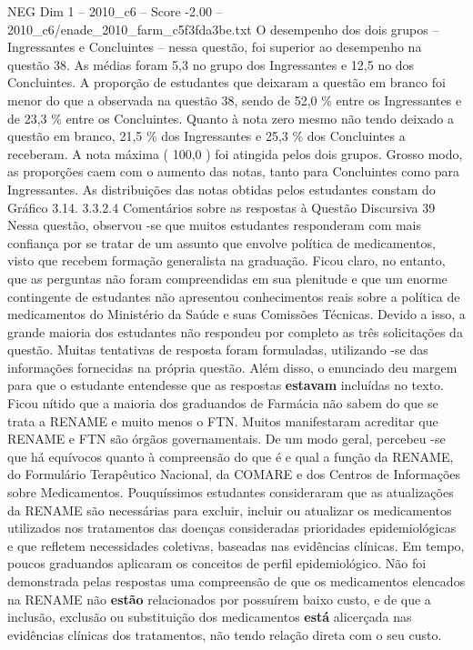 \begin{textsample}{NEG Dim 1 – 2010\_c6 – Score -2.00 – 2010\_c6/enade\_2010\_farm\_c5f3fda3be.txt}
O desempenho dos dois grupos – Ingressantes e Concluintes – nessa questão, foi superior ao desempenho na questão 38.
As médias foram 5,3 no grupo dos Ingressantes e 12,5 no dos Concluintes.
A proporção de estudantes que deixaram a questão em branco foi menor do que a observada na questão 38, sendo de 52,0 \% entre os Ingressantes e de 23,3 \% entre os Concluintes.
Quanto à nota zero mesmo não tendo deixado a questão em branco, 21,5 \% dos Ingressantes e 25,3 \% dos Concluintes a receberam.
A nota máxima ( 100,0 ) foi atingida pelos dois grupos.
Grosso modo, as proporções caem com o aumento das notas, tanto para Concluintes como para Ingressantes.
As distribuições das notas obtidas pelos estudantes constam do Gráfico 3.14. 3.3.2.4 Comentários sobre as respostas à Questão Discursiva 39 Nessa questão, observou -se que muitos estudantes responderam com mais confiança por se tratar de um assunto que envolve política de medicamentos, visto que recebem formação generalista na graduação.
Ficou claro, no entanto, que as perguntas não foram compreendidas em sua plenitude e que um enorme contingente de estudantes não apresentou conhecimentos reais sobre a política de medicamentos do Ministério da Saúde e suas Comissões Técnicas.
Devido a isso, a grande maioria dos estudantes não respondeu por completo as três solicitações da questão.
Muitas tentativas de resposta foram formuladas, utilizando -se das informações fornecidas na própria questão.
Além disso, o enunciado deu margem para que o estudante entendesse que as respostas \textbf{estavam} incluídas no texto.
Ficou nítido que a maioria dos graduandos de Farmácia não sabem do que se trata a RENAME e muito menos o FTN.
Muitos manifestaram acreditar que RENAME e FTN são órgãos governamentais.
De um modo geral, percebeu -se que há equívocos quanto à compreensão do que é e qual a função da RENAME, do Formulário Terapêutico Nacional, da COMARE e dos Centros de Informações sobre Medicamentos.
Pouquíssimos estudantes consideraram que as atualizações da RENAME são necessárias para excluir, incluir ou atualizar os medicamentos utilizados nos tratamentos das doenças consideradas prioridades epidemiológicas e que refletem necessidades coletivas, baseadas nas evidências clínicas.
Em tempo, poucos graduandos aplicaram os conceitos de perfil epidemiológico.
Não foi demonstrada pelas respostas uma compreensão de que os medicamentos elencados na RENAME não \textbf{estão} relacionados por possuírem baixo custo, e de que a inclusão, exclusão ou substituição dos medicamentos \textbf{está} alicerçada nas evidências clínicas dos tratamentos, não tendo relação direta com o seu custo.

\end{textsample}
